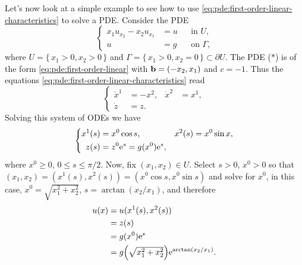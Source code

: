 \begin{example}
  Let's now look at a simple example to see how to use
  \eqref{eq:pde:first-order-linear-characteristics} to solve a PDE.
  Consider the PDE
  \[
    \tag{\(*\)}
    \left\{
      \begin{aligned}
        x_1u_{x_2}-x_2u_{x_1}&=u&&\text{in \(U\),}\\
        u&=g&&\text{on \(\Gamma\),}
      \end{aligned}
    \right.
  \]
  where \(U=\{\,x_1>0,x_2>0\,\}\) and
  \(\Gamma=\{\,x_1>0,x_2=0\,\}\subset\partial U\).  The PDE (\(*\)) is of
  the form \eqref{eq:pde:first-order-linear} with \(\mathbf{b}=(-x_2,x_1)\) and
  \(c=-1\). Thus the equations
  \eqref{eq:pde:first-order-linear-characteristics} read
  \[
    \left\{ \tag{\(**\)}
      \begin{aligned}
        \dot x^1&=-x^2,&\dot x^2&=x^1,\\
        \dot z&=z.
      \end{aligned}
    \right.
  \]
  Solving this system of ODEs we have
  \[
    \left\{
      \begin{aligned}
        x^1(s)&=x^0\cos s,&x^2(s)&=x^0\sin x,\\
        z(s)&=z^0\mathrm{e}^s=g(x^0)\mathrm{e}^s,
      \end{aligned}
    \right.
  \]
  where \(x^0\geq 0\), \(0\leq s\leq \pi/2\). Now, fix \((x_1,x_2)\in
  U\). Select \(s>0\), \(x^0>0\) so that
  \((x_1,x_2)=(x^1(s),x^2(s))=(x^0\cos s,x^0\sin s)\) and solve for
  \(x^0\), in this case, \(x^0=\sqrt{x_1^2+x_2^2}\),
  \(s=\arctan(x_2/x_1)\), and therefore
  \begin{align*}
    u(x)&=u(x^1(s),x^2(s))\\
        &=z(s)\\
        &=g(x^0)\mathrm{e}^s\\
        &=g\Bigl({\textstyle\sqrt{x_1^2+x_2^2}}\Bigr)\mathrm{e}^{\arctan(x_2/x_1)}.
  \end{align*}
\end{example}

